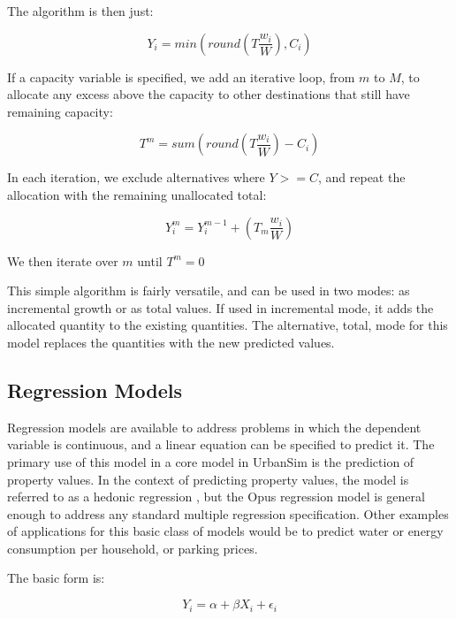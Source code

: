The algorithm is then just:

\begin{equation}
Y_i = min(round(T\frac{w_i}{W}),C_i)
\end{equation}

If a capacity variable is specified, we add an iterative
loop, from $m$ to $M$, to allocate any excess above the
capacity to other destinations that still have remaining
capacity:

\begin{equation}
T^m = sum(round(T\frac{w_i}{W}) - C_i)
\end{equation}

In each iteration, we exclude alternatives where $Y>=C$, and
repeat the allocation with the remaining unallocated total:

\begin{equation}
Y^m_i = Y^{m-1}_i + (T_m\frac{w_i}{W})
\end{equation}

We then iterate over $m$ until $T^m = 0$ 

This simple algorithm is fairly versatile, and can be used
in two modes: as incremental growth or as total values. If
used in incremental mode, it adds the allocated quantity to
the existing quantities.  The alternative, total, mode for
this model replaces the quantities with the new predicted
values.

\subsection{Regression Models}
%
\label{sec:components-regression-model}


Regression models are available to address problems in which
the dependent variable is continuous, and a linear equation
can be specified to predict it.  The primary use of this
model in a core model in UrbanSim is the prediction of
property values.  In the context of predicting property
values, the model is referred to as a hedonic regression
\cite{waddell-hedonic-1993}, but the Opus regression model
is general enough to address any standard multiple
regression specification.  Other examples of applications
for this basic class of models would be to predict water or
energy consumption per household, or parking prices.

The basic form is:

\begin{equation}
Y_i = \alpha + \beta X_i + \epsilon_i
\end{equation}

